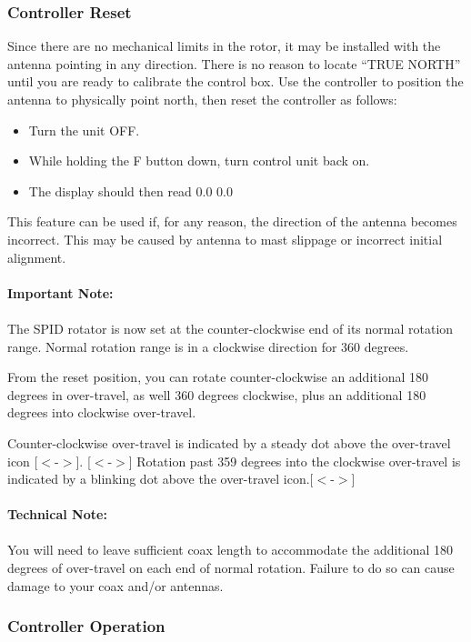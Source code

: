\documentclass[11pt]{article} %
\begin{document}
\subsubsection{Controller Reset}

Since there are no mechanical limits in the rotor, it may be installed with the antenna pointing in any direction. There is no reason to locate “TRUE NORTH” until you are ready to calibrate the control box. Use the controller to position the antenna to physically point north, then reset the controller as follows:
\begin{itemize}
\item Turn the unit OFF.
\item While holding the F button down, turn control unit back on.
\item The display should then read 0.0 0.0
\end{itemize}

This feature can be used if, for any reason, the direction of the antenna becomes incorrect. This may be caused by antenna to mast slippage or incorrect initial alignment.
\\ \\
\textbf{Important Note:}
\\ \\
The SPID rotator is now set at the counter-clockwise end of its normal rotation range. Normal rotation range is in a clockwise direction for 360 degrees.

From the reset position, you can rotate counter-clockwise an additional 180 degrees in over-travel, as well 360 degrees clockwise, plus an additional 180 degrees into clockwise over-travel.

Counter-clockwise over-travel is indicated by a steady dot above the over-travel icon [$<$-$>$]. [$<$-$>$] Rotation past 359 degrees into the clockwise over-travel is indicated by a blinking dot above the over-travel icon.[$<$-$>$]
\\ \\
\textbf{Technical Note:}
\\ \\
You will need to leave sufficient coax length to accommodate the additional 180 degrees of over-travel on each end of normal rotation. Failure to do so can cause damage to your coax and/or antennas.

\subsubsection{Controller Operation}
\end{document}
